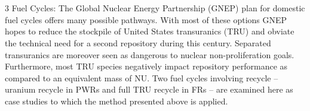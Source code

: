 \section{}
\label{1g_sec:}
3 Fuel Cycles:
The Global Nuclear Energy Partnership (GNEP) plan for domestic fuel cycles offers many possible pathways.  With most of these options GNEP hopes to reduce the stockpile of United States transuranics (TRU) and obviate the technical need for a second repository during this century.  Separated transuranics are moreover seen as dangerous to nuclear non-proliferation goals.  Furthermore, most TRU species negatively impact repository performance as compared to an equivalent mass of NU.  Two fuel cycles involving recycle – uranium recycle in PWRs and full TRU recycle in FRs – are examined here as case studies to which the method presented above is applied. 


